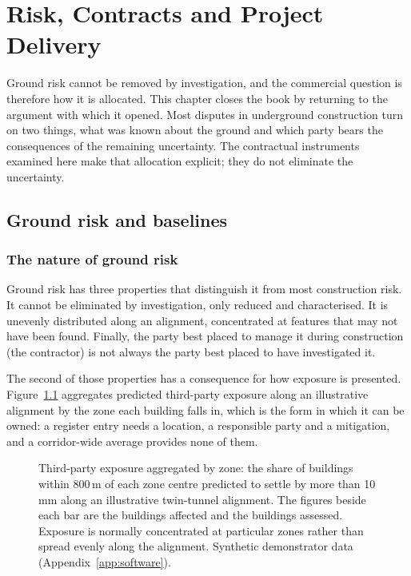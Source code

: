 \chapter{Risk, Contracts and Project Delivery}
\label{ch:delivery}

Ground risk cannot be removed by investigation, and the commercial question is
therefore how it is allocated. This chapter closes the book by returning to
the argument with which it opened. Most disputes in underground construction
turn on two things, what was known about the ground and which party bears the
consequences of the remaining uncertainty. The contractual instruments examined
here make that allocation explicit; they do not eliminate the
uncertainty.

\section{Ground risk and baselines}
\label{sec:ground-risk-baselines}

\subsection{The nature of ground risk}
\label{sec:nature-ground-risk}

Ground risk has three properties that distinguish it from most construction
risk. It cannot be eliminated by investigation, only reduced and
characterised. It is unevenly distributed along an alignment, concentrated at
features that may not have been found. Finally, the party best placed to manage it
during construction (the contractor) is not always the party best placed
to have investigated it.

The second of those properties has a consequence for how exposure is
presented. Figure~\ref{fig:exposure-by-zone} aggregates predicted
third-party exposure along an illustrative alignment by the zone each building
falls in,
which is the form in which it can be owned: a register entry needs a location,
a responsible party and a mitigation, and a corridor-wide average provides none
of them.

\begin{figure}[htbp]
\centering
{}
\caption[Third-party exposure aggregated by zone]{%
Third-party exposure aggregated by zone: the share of buildings
within 800\,m of each zone centre predicted to settle by more than 10\,mm along
an illustrative twin-tunnel alignment. The figures beside each bar are the
buildings affected and the buildings assessed. Exposure is normally
concentrated at particular zones rather than spread evenly along the alignment.
Synthetic demonstrator data (Appendix~\ref{app:software}).}
\label{fig:exposure-by-zone}
\end{figure}

